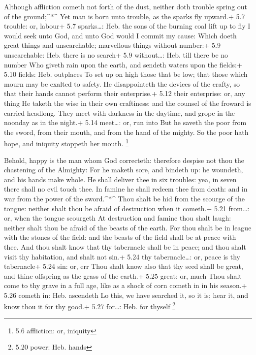  Although affliction cometh not forth of the dust, neither
doth trouble spring out of the ground;\^{}*\^{}  Yet man is
born unto trouble, as the sparks fly upward.+ 5.7 trouble: or, labour+
5.7 sparks\ldots: Heb. the sons of the burning coal lift up to fly
 I would seek unto God, and unto God would I commit my
cause:  Which doeth great things and unsearchable;
marvellous things without number:+ 5.9 unsearchable: Heb. there is no
search+ 5.9 without\ldots: Heb. till there be no number 
Who giveth rain upon the earth, and sendeth waters upon the fields:+
5.10 fields: Heb. outplaces  To set up on high those that
be low; that those which mourn may be exalted to safety. 
He disappointeth the devices of the crafty, so that their hands cannot
perform their enterprise.+ 5.12 their enterprise: or, any thing
 He taketh the wise in their own craftiness: and the
counsel of the froward is carried headlong.  They meet with
darkness in the daytime, and grope in the noonday as in the night.+ 5.14
meet\ldots: or, run into  But he saveth the poor from the
sword, from their mouth, and from the hand of the mighty. 
So the poor hath hope, and iniquity stoppeth her mouth. \footnote{5.6
  affliction: or, iniquity}

 Behold, happy is the man whom God correcteth: therefore
despise not thou the chastening of the Almighty:  For he
maketh sore, and bindeth up: he woundeth, and his hands make whole.
 He shall deliver thee in six troubles: yea, in seven there
shall no evil touch thee.  In famine he shall redeem thee
from death: and in war from the power of the sword.\^{}*\^{}
 Thou shalt be hid from the scourge of the tongue: neither
shalt thou be afraid of destruction when it cometh.+ 5.21 from\ldots:
or, when the tongue scourgeth  At destruction and famine
thou shalt laugh: neither shalt thou be afraid of the beasts of the
earth.  For thou shalt be in league with the stones of the
field: and the beasts of the field shall be at peace with thee.
 And thou shalt know that thy tabernacle shall be in peace;
and thou shalt visit thy habitation, and shalt not sin.+ 5.24 thy
tabernacle\ldots: or, peace is thy tabernacle+ 5.24 sin: or, err
 Thou shalt know also that thy seed shall be great, and
thine offspring as the grass of the earth.+ 5.25 great: or, much
 Thou shalt come to thy grave in a full age, like as a
shock of corn cometh in in his season.+ 5.26 cometh in: Heb. ascendeth
 Lo this, we have searched it, so it is; hear it, and know
thou it for thy good.+ 5.27 for\ldots: Heb. for thyself \footnote{5.20
  power: Heb. hands}

